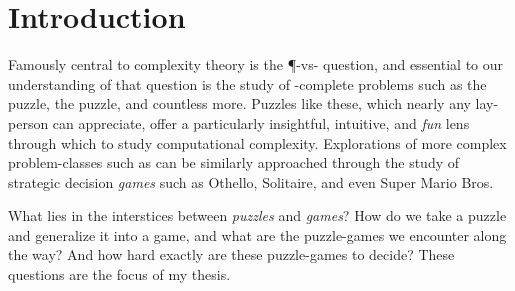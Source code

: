 \chapter{Introduction}

Famously central to complexity theory is the \P-vs-\NP{} question, and
essential to our understanding of that question is the study of \NP-complete
problems such as the  puzzle, the
 puzzle, and countless more.  Puzzles like these,
which nearly any lay-person can appreciate, offer a particularly insightful,
intuitive, and \emph{fun} lens through which to study computational complexity.
Explorations of more complex problem-classes such as \PSPACE{} can be similarly
approached through the study of strategic decision \emph{games} such as
Othello, Solitaire, and even Super Mario Bros.

What lies in the interstices between \emph{puzzles} and \emph{games}?  How do
we take a puzzle and generalize it into a game, and what are the puzzle-games
we encounter along the way?  And how hard exactly are these puzzle-games to
decide?  These questions are the focus of my thesis.

